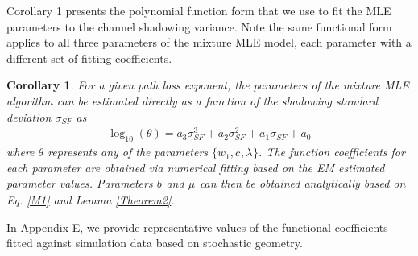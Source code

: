 \documentclass[12pt, draftclsnofoot, onecolumn]{IEEEtran}
\newtheorem{corollary}{Corollary}
\theoremstyle{plain}
\begin{document}
Corollary 1 presents the polynomial function form that we use to fit the MLE parameters to the {\color{black}channel} shadowing variance. Note the same functional form applies to all three parameters of the mixture MLE model, each parameter with a different set of fitting coefficients. \vspace{-.1in}
\begin{corollary}\label{ParameterFitLemma}
For a given path loss exponent, the parameters of the mixture MLE algorithm can be estimated directly as a function of the shadowing standard deviation $\sigma_{SF}$ as \vspace{-.08in}
\begin{eqnarray} \label{FitEq}
\log_{10} \left( \theta \right)= a_3 \sigma_{SF}^3 +a_2 \sigma_{SF}^2 + a_1 \sigma_{SF} + a_0
\end{eqnarray}
where $\theta$ represents any of the parameters $\{w_1, {{c_{}}},{{\lambda_{}}} \}$. The function coefficients for each parameter are
obtained via numerical fitting based on the EM estimated parameter values. Parameters ${{b_{}}}$ and ${{\mu_{}}}$ can then be obtained analytically based on Eq. \eqref{M1} and Lemma \ref{Theorem2}.
\end{corollary} \vspace{-.1in}
In Appendix E, we provide representative values of the functional coefficients fitted against simulation data based on stochastic geometry. %
\end{document}
